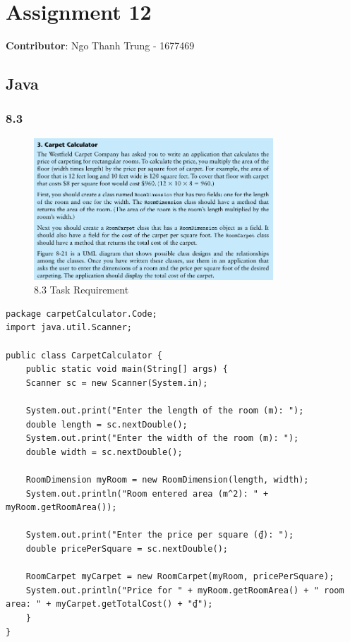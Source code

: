 \documentclass{article}
\begin{document}
\section*{Assignment 12}

\textbf{Contributor}: Ngo Thanh Trung - 1677469

\subsection*{Java}

\subsubsection*{8.3}

\begin{figure}[H]
    \centering
    \includegraphics[width=0.8\textwidth]{./Assets/Task requirements/Assignment12/8.3.png}
    \caption{8.3 Task Requirement}
\end{figure}

\begin{lstlisting}[caption=CarpetCalculator.java]
package carpetCalculator.Code;
import java.util.Scanner;

public class CarpetCalculator {
    public static void main(String[] args) {
    Scanner sc = new Scanner(System.in);

    System.out.print("Enter the length of the room (m): ");
    double length = sc.nextDouble();
    System.out.print("Enter the width of the room (m): ");
    double width = sc.nextDouble();

    RoomDimension myRoom = new RoomDimension(length, width);
    System.out.println("Room entered area (m^2): " + myRoom.getRoomArea());

    System.out.print("Enter the price per square (₫): ");
    double pricePerSquare = sc.nextDouble();

    RoomCarpet myCarpet = new RoomCarpet(myRoom, pricePerSquare);
    System.out.println("Price for " + myRoom.getRoomArea() + " room area: " + myCarpet.getTotalCost() + "₫");
    }
}
\end{lstlisting}
\end{document}
